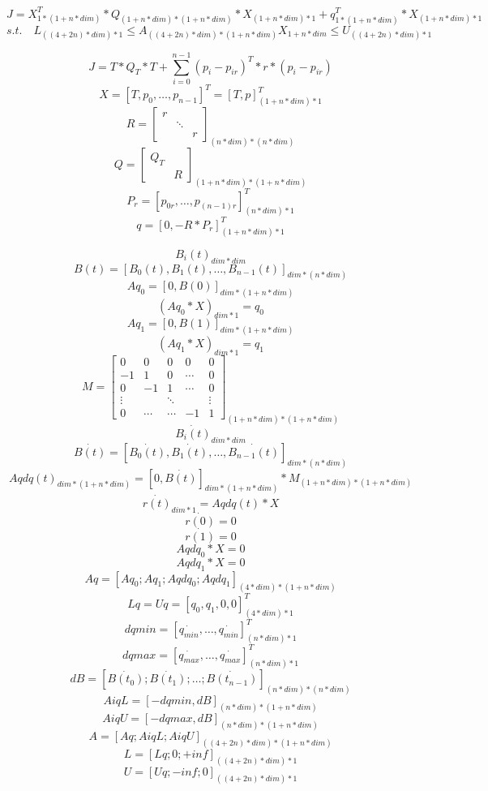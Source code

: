 \documentclass[]{article}
\begin{document}
    \[ J = X^{T}_{1 * (1 + n * dim)} * Q_{(1 + n * dim) * (1 + n * dim)} * X_{(1 + n * dim) * 1} + q^{T}_{1 * (1 + n * dim)} * X_{(1 + n * dim) * 1} \]
    \[ s.t.\quad L_{{((4 + 2n) * dim) * 1}} \leq A_{{((4 + 2n) * dim) * (1 + n * dim)}}X_{1 + n * dim} \leq U_{{((4 + 2n) * dim) * 1}} \]

    \[ J = T * Q_{T} * T + \sum_{i = 0}^{n - 1}(p_{i} - p_{ir})^{T} * r * (p_{i} - p_{ir}) \]
    \[X = [T, p_{0}, \ldots, p_{n - 1}]^{T} = [T, p]^{T}_{(1 + n * dim) * 1} \]
    \[ R = \begin{bmatrix}
             r    &    & \\
             & \ddots  & \\
             &    &    r
    \end{bmatrix}_{(n * dim) * (n * dim)} \]
    \[ Q = \begin{bmatrix}
        Q_{T} & \\
         &    R   
    \end{bmatrix}_{(1 + n * dim) * (1 + n * dim)} \]
    \[ P_{r} = [p_{0r},\ldots,p_{(n - 1)r}]^{T}_{(n * dim) * 1} \]
    \[ q = [0, -R * P_{r}]^{T}_{(1 + n * dim) * 1} \]

    \[B_{i}(t)_{dim * dim} \]
    \[B(t) = [B_{0}(t), B_{1}(t), \ldots, B_{n - 1}(t)]_{dim * (n * dim)} \]
    \[ Aq_{0} = [0, B(0)]_{dim * (1 + n * dim)} \]
    \[ (Aq_{0} * X)_{dim * 1} = q_{0} \]
    \[ Aq_{1} = [0, B(1)]_{dim * (1 + n * dim)} \]
    \[ (Aq_{1} * X)_{dim * 1} = q_{1} \]
    \[ M = \begin{bmatrix}
         0 & 0 & 0 & 0 & 0 \\
        -1 & 1 & 0 & \cdots & 0 \\
         0 & -1 & 1 & \cdots & 0 \\
         \vdots & & \ddots & & \vdots \\
         0 & \cdots &\cdots &-1 & 1
    \end{bmatrix}_{(1 + n * dim) * (1 + n * dim)} \]
    \[ \dot{B_i(t)}_{dim * dim}\]
    \[ \dot{B(t)} =  [\dot{B_{0}(t)}, \dot{B_{1}(t)}, \ldots, \dot{B_{n - 1}(t)}]_{dim * (n * dim)} \]
    \[ Aqdq(t)_{dim * (1 + n * dim)} = [0, \dot{B(t)}]_{dim * (1 + n * dim)} * M_{(1 + n * dim) * (1 + n * dim)} \]
    \[ \dot{r(t)}_{dim * 1} = Aqdq(t) * X \]
    \[ \dot{r(0)} = 0 \]
    \[ \dot{r(1)} = 0 \]
    \[ Aqdq_{0} * X = 0 \]
    \[ Aqdq_{1} * X = 0 \]
    \[ Aq = [Aq_{0}; Aq_{1}; Aqdq_{0}; Aqdq_{1}]_{(4 * dim) * (1 + n * dim)} \]
    \[ Lq = Uq = [q_{0}, q_{1}, 0, 0]^{T}_{(4 * dim) * 1} \]
    \[ dqmin = [\dot{q_{min}}, \ldots, \dot{q_{min}}]^{T}_{(n * dim) * 1} \]
    \[ dqmax = [\dot{q_{max}}, \ldots, \dot{q_{max}}]^{T}_{(n * dim) * 1} \]
    \[ dB = [\dot{B(t_{0})}; \dot{B(t_{1})}; \ldots; \dot{B(t_{n - 1})}]_{(n * dim) * (n * dim)} \]
    \[ AiqL = [-dqmin, dB]_{(n * dim) * (1 + n * dim)} \]
    \[ AiqU = [-dqmax, dB]_{(n * dim) * (1 + n * dim)} \]
    \[ A = [Aq; AiqL; AiqU]_{((4 + 2n) * dim) * (1 + n * dim)}\]
    \[ L = [Lq; 0; +inf]_{((4 + 2n) * dim) * 1}\]
    \[ U = [Uq; -inf; 0]_{((4 + 2n) * dim) * 1}\]
\end{document}
